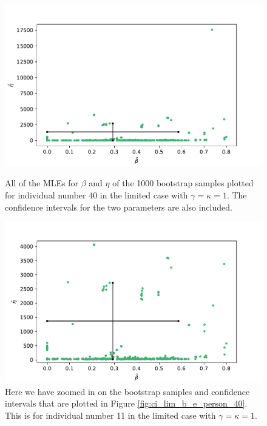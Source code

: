\begin{figure}
    \centering
    \begin{minipage}{0.48\textwidth}
        \centering
        \includegraphics[scale=0.32]{pictures/ci_lim_b_e_person40_pdf.pdf}
        \caption[MLEs for $\beta$ and $\eta$ for bootstrap samples individual 40, limited]{All of the MLEs for $\beta$ and $\eta$ of the 1000 bootstrap samples plotted for individual number 40 in the limited case with $\gamma=\kappa=1$. The confidence intervals for the two parameters are also included.}
        \label{fig:ci_lim_b_e_person_40}
    \end{minipage}\hfill
    \begin{minipage}{0.48\textwidth}
        \centering
        \includegraphics[scale=0.32]{pictures/ci_lim_b_e_person40_zoomed_pdf.pdf}
        \caption[MLEs for $\beta$ and $\eta$ of bootstrap samples individual 40, limited, zoomed]{Here we have zoomed in on the bootstrap samples and confidence intervals that are plotted in Figure \ref{fig:ci_lim_b_e_person_40}. This is for individual number 11 in the limited case with $\gamma=\kappa=1$.}
        \label{fig:ci_lim_b_e_person_40_zoomed}
    \end{minipage}
\end{figure}

